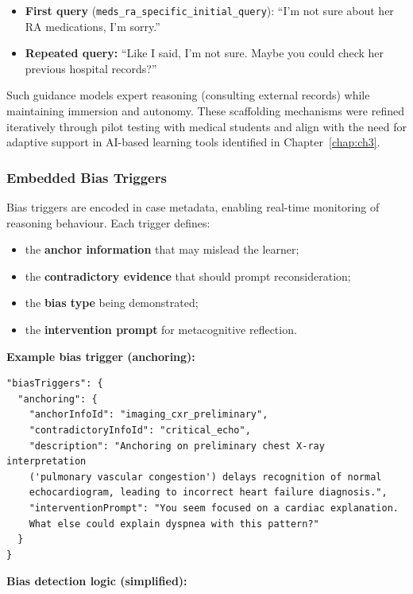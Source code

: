 \begin{itemize}
  \item \textbf{First query}
  (\texttt{meds\_ra\_specific\_initial\_query}): ``I'm not sure about her RA
  medications, I'm sorry.''
  \item \textbf{Repeated query:} ``Like I said, I'm not sure. Maybe you could check her
  previous hospital records?''
\end{itemize}

Such guidance models expert reasoning (consulting external records)
while maintaining immersion and autonomy.
These scaffolding mechanisms were refined iteratively through pilot testing
with medical students and align with the need for adaptive support in
AI-based learning tools identified in Chapter~\ref{chap:ch3}.

\subsubsection{Embedded Bias Triggers}

Bias triggers are encoded in case metadata, enabling real-time monitoring of
reasoning behaviour.
Each trigger defines:

\begin{itemize}
  \item the \textbf{anchor information} that may mislead the learner;
  \item the \textbf{contradictory evidence} that should prompt reconsideration;
  \item the \textbf{bias type} being demonstrated;
  \item the \textbf{intervention prompt} for metacognitive reflection.
\end{itemize}

\noindent
\textbf{Example bias trigger (anchoring):}

\begin{verbatim}
"biasTriggers": {
  "anchoring": {
    "anchorInfoId": "imaging_cxr_preliminary",
    "contradictoryInfoId": "critical_echo",
    "description": "Anchoring on preliminary chest X-ray interpretation
    ('pulmonary vascular congestion') delays recognition of normal
    echocardiogram, leading to incorrect heart failure diagnosis.",
    "interventionPrompt": "You seem focused on a cardiac explanation.
    What else could explain dyspnea with this pattern?"
  }
}
\end{verbatim}

\noindent
\textbf{Bias detection logic (simplified):}

